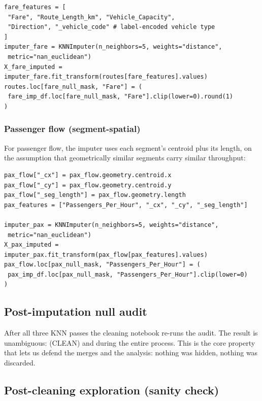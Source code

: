 \begin{lstlisting}[caption={KNN imputation on Routes Fare, five attribute features.}]
fare_features = [
 "Fare", "Route_Length_km", "Vehicle_Capacity",
 "Direction", "_vehicle_code" # label-encoded vehicle type
]
imputer_fare = KNNImputer(n_neighbors=5, weights="distance",
 metric="nan_euclidean")
X_fare_imputed = imputer_fare.fit_transform(routes[fare_features].values)
routes.loc[fare_null_mask, "Fare"] = (
 fare_imp_df.loc[fare_null_mask, "Fare"].clip(lower=0).round(1)
)
\end{lstlisting}

\subsubsection{Passenger flow (segment-spatial)}

For passenger flow, the imputer uses each segment's centroid plus its
length, on the assumption that geometrically similar segments carry
similar throughput:

\begin{lstlisting}[caption={KNN imputation on Passenger Flow, centroid + length.}]
pax_flow["_cx"] = pax_flow.geometry.centroid.x
pax_flow["_cy"] = pax_flow.geometry.centroid.y
pax_flow["_seg_length"] = pax_flow.geometry.length
pax_features = ["Passengers_Per_Hour", "_cx", "_cy", "_seg_length"]

imputer_pax = KNNImputer(n_neighbors=5, weights="distance",
 metric="nan_euclidean")
X_pax_imputed = imputer_pax.fit_transform(pax_flow[pax_features].values)
pax_flow.loc[pax_null_mask, "Passengers_Per_Hour"] = (
 pax_imp_df.loc[pax_null_mask, "Passengers_Per_Hour"].clip(lower=0)
)
\end{lstlisting}

\subsection{Post-imputation null audit}

After all three KNN passes the cleaning notebook re-runs the audit. The
result is unambiguous:  (CLEAN) and  during the entire
process. This is the core property that lets us defend the merges and
the analysis: nothing was hidden, nothing was discarded.

\subsection{Post-cleaning exploration (sanity check)}

